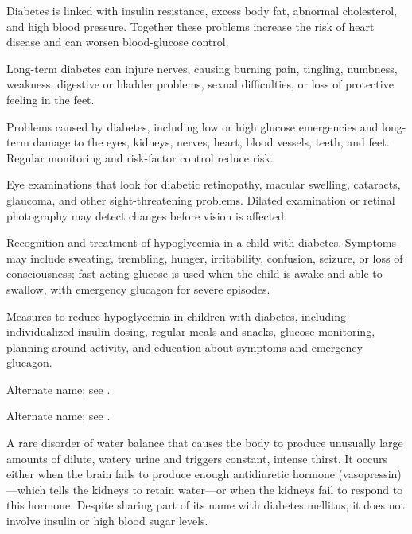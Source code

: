  Diabetes is linked with insulin resistance, excess body fat, abnormal cholesterol, and high blood pressure. Together these problems increase the risk of heart disease and can worsen blood-glucose control.

 Long-term diabetes can injure nerves, causing burning pain, tingling, numbness, weakness, digestive or bladder problems, sexual difficulties, or loss of protective feeling in the feet.

 Problems caused by diabetes, including low or high glucose emergencies and long-term damage to the eyes, kidneys, nerves, heart, blood vessels, teeth, and feet. Regular monitoring and risk-factor control reduce risk.

 Eye examinations that look for diabetic retinopathy, macular swelling, cataracts, glaucoma, and other sight-threatening problems. Dilated examination or retinal photography may detect changes before vision is affected.

 Recognition and treatment of hypoglycemia in a child with diabetes. Symptoms may include sweating, trembling, hunger, irritability, confusion, seizure, or loss of consciousness; fast-acting glucose is used when the child is awake and able to swallow, with emergency glucagon for severe episodes.

 Measures to reduce hypoglycemia in children with diabetes, including individualized insulin dosing, regular meals and snacks, glucose monitoring, planning around activity, and education about symptoms and emergency glucagon.

 Alternate name; see .

 Alternate name; see .

 A rare disorder of water balance that causes the body to produce unusually large amounts of dilute, watery urine and triggers constant, intense thirst. It occurs either when the brain fails to produce enough antidiuretic hormone (vasopressin)---which tells the kidneys to retain water---or when the kidneys fail to respond to this hormone. Despite sharing part of its name with diabetes mellitus, it does not involve insulin or high blood sugar levels.

